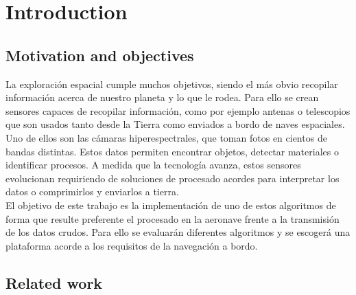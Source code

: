 \cleardoublepage
\chapter{Introduction}
\label{makereference}

\section{Motivation and objectives}

La exploración espacial cumple muchos objetivos, siendo el más obvio recopilar información acerca de nuestro planeta y lo que le rodea. Para ello se crean sensores capaces de recopilar información, como por ejemplo antenas o telescopios que son usados tanto desde la Tierra como enviados a bordo de naves espaciales. Uno de ellos son las cámaras hiperespectrales, que toman fotos en cientos de bandas distintas. Estos datos permiten encontrar objetos, detectar materiales o identificar procesos. A medida que la tecnología avanza, estos sensores evolucionan requiriendo de soluciones de procesado acordes para interpretar los datos o comprimirlos y enviarlos a tierra.
\\
El objetivo de este trabajo es la implementación de uno de estos algoritmos de forma que resulte preferente el procesado en la aeronave frente a la transmisión de los datos crudos. Para ello se evaluarán diferentes algoritmos y se escogerá una plataforma acorde a los requisitos de la navegación a bordo.

\section{Related work}

